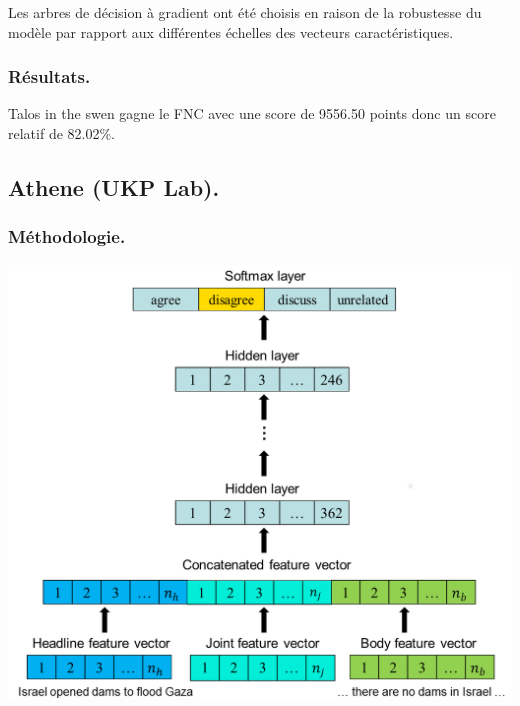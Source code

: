 \documentclass[11pt,a4paper,oldfontcommands]{memoir}
\begin{document}
Les arbres de décision à gradient ont été choisis en raison de la robustesse du modèle par rapport aux différentes échelles des vecteurs caractéristiques.

\subsubsection{Résultats.}
Talos in the swen gagne le FNC avec une score de 9556.50 points donc un score relatif de 82.02\%.




\subsection{Athene (UKP Lab).}
\subsubsection{Méthodologie.}

\begin{center}
 \includegraphics[scale=0.25]{../../img/model/athene/athene_model.png}
 \label{fig3}
\end{center}
\end{document}

